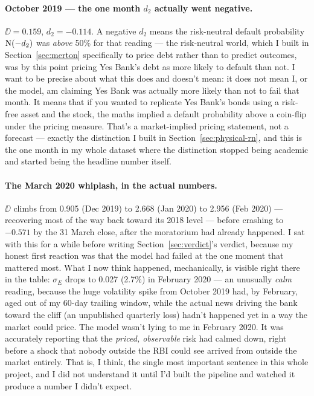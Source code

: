 \paragraph{October 2019 — the one month $d_2$ actually went negative.} $\DD=0.159$, $d_2=-0.114$. A negative $d_2$ means the risk-neutral default probability $\mathrm{N}(-d_2)$ was \emph{above} 50\% for that reading — the risk-neutral world, which I built in Section~\ref{sec:merton} specifically to price debt rather than to predict outcomes, was by this point pricing Yes Bank's debt as more likely to default than not. I want to be precise about what this does and doesn't mean: it does not mean I, or the model, am claiming Yes Bank was actually more likely than not to fail that month. It means that if you wanted to replicate Yes Bank's bonds using a risk-free asset and the stock, the maths implied a default probability above a coin-flip under the pricing measure. That's a market-implied pricing statement, not a forecast — exactly the distinction I built in Section~\ref{sec:physical-rn}, and this is the one month in my whole dataset where the distinction stopped being academic and started being the headline number itself.

\paragraph{The March 2020 whiplash, in the actual numbers.} $\DD$ climbs from 0.905 (Dec 2019) to 2.668 (Jan 2020) to 2.956 (Feb 2020) — recovering most of the way back toward its 2018 level — before crashing to $-0.571$ by the 31 March close, after the moratorium had already happened. I sat with this for a while before writing Section~\ref{sec:verdict}'s verdict, because my honest first reaction was that the model had failed at the one moment that mattered most. What I now think happened, mechanically, is visible right there in the table: $\sigma_E$ drops to 0.027 (2.7\%) in February 2020 — an unusually \emph{calm} reading, because the huge volatility spike from October 2019 had, by February, aged out of my 60-day trailing window, while the actual news driving the bank toward the cliff (an unpublished quarterly loss) hadn't happened yet in a way the market could price. The model wasn't lying to me in February 2020. It was accurately reporting that the \emph{priced, observable} risk had calmed down, right before a shock that nobody outside the RBI could see arrived from outside the market entirely. That is, I think, the single most important sentence in this whole project, and I did not understand it until I'd built the pipeline and watched it produce a number I didn't expect.

